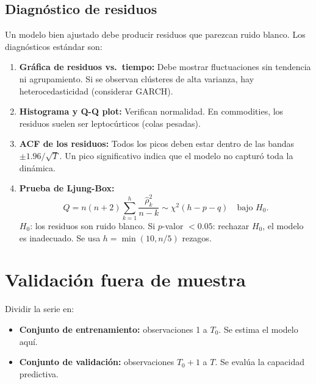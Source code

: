 \documentclass[12pt,a4paper]{article}
\theoremstyle{definition}
\begin{document}
\subsection{Diagnóstico de residuos}

Un modelo bien ajustado debe producir residuos que parezcan ruido blanco.
Los diagnósticos estándar son:

\begin{enumerate}
  \item \textbf{Gráfica de residuos vs.\ tiempo:} Debe mostrar fluctuaciones
        sin tendencia ni agrupamiento. Si se observan clústeres de alta
        varianza, hay heterocedasticidad (considerar GARCH).

  \item \textbf{Histograma y Q-Q plot:} Verifican normalidad. En commodities,
        los residuos suelen ser leptocúrticos (colas pesadas).

  \item \textbf{ACF de los residuos:} Todos los picos deben estar dentro de
        las bandas $\pm 1.96/\sqrt{T}$. Un pico significativo indica que el
        modelo no capturó toda la dinámica.

  \item \textbf{Prueba de Ljung-Box:}
    \[
      Q = n(n+2)\sum_{k=1}^{h}\frac{\hat{\rho}_k^2}{n-k}
      \sim \chi^2(h-p-q) \quad \text{bajo }H_0.
    \]
    $H_0$: los residuos son ruido blanco.
    Si $p$-valor $< 0.05$: rechazar $H_0$, el modelo es inadecuado.
    Se usa $h = \min(10, n/5)$ rezagos.
\end{enumerate}

\section{Validación fuera de muestra}

\begin{defbox}
Dividir la serie en:
\begin{itemize}[nosep]
  \item \textbf{Conjunto de entrenamiento:} observaciones 1 a $T_0$. Se
        estima el modelo aquí.
  \item \textbf{Conjunto de validación:} observaciones $T_0+1$ a $T$.
        Se evalúa la capacidad predictiva.
\end{itemize}
\end{defbox}
\end{document}

